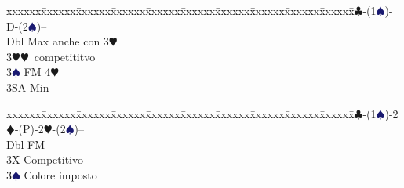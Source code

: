 \documentclass[a4paper,italian]{article}
\newcommand{\BC}{\textcolor{OliveGreen}{$\clubsuit$}}
\newcommand{\BD}{\textcolor{RedOrange}{$\vardiamondsuit$}}
\newcommand{\BH}{\textcolor{Red2}{$\varheartsuit${}}}
\newcommand{\BS}{\textcolor{MidnightBlue}{$\spadesuit${}}}
\newenvironment{bidtable}
{\begin{tabbing}

    xxxxxx\=xxxxxx\=xxxxxx\=xxxxxx\=xxxxxx\=xxxxxx\=xxxxxx\=xxxxxx\=xxxxxx\=xxxxxx\=\kill}
{\end{tabbing} }%
\newenvironment{sviluppi}
{\begin{tcolorbox}[colframe=azzurro,title=Sviluppi particolari]}
    {
\end{tcolorbox} }%
\begin{document}
\begin{multicols}{2}
    \begin{sviluppi}
        \begin{bidtable}
            1\BC-(1\BS)-D-(2\BS)--\+\\
            Dbl \> Max anche con 3\BH \\
            3\BH {}\BH\ competititvo\\
            3\BS \> FM 4\BH \+\\
            3SA \> Min\-\-
        \end{bidtable}
        \bigbreak
        \begin{bidtable}
            1\BC-(1\BS)-2\BD-(P)-2\BH-(2\BS)--\+\\
            Dbl \> FM\\
            3X \> Competitivo\\
            3\BS \> Colore imposto\-
        \end{bidtable}
    \end{sviluppi}


\end{multicols}
\end{document}
